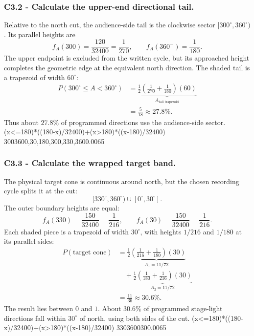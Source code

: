 	\subsubsection*{C3.2 - Calculate the upper-end directional tail.}
	\label{subsec:c3-triangular-north-b}
	Relative to the north cut, the audience-side tail is the clockwise sector
	$[300^\circ,360^\circ)$.  Its parallel heights are
	\[
	f_A(300)=\frac{120}{32400}=\frac1{270},
	\qquad f_A(360^-)=\frac1{180}.
	\]
	The upper endpoint is excluded from the written cycle, but its approached
	height completes the geometric edge at the equivalent north direction.  The
	shaded tail is a trapezoid of width $60^\circ$:
	\[
	\begin{aligned}
		P(300^\circ\le A<360^\circ)
		&=\underbrace{\frac12\left(\frac1{270}+\frac1{180}\right)(60)}
		_{A_{\text{tail trapezoid}}}\\
		&=\frac5{18}\approx27.8\%.
	\end{aligned}
	\]
	Thus about $27.8\%$ of programmed directions use the audience-side sector.
	\begingroup
	{(x<=180)*((180-x)/32400)+(x>180)*((x-180)/32400)}
	{300}{360}{0,30,180,300,330,360}{0.0065}
	\endgroup
	
	\clearpage
	\subsubsection*{C3.3 - Calculate the wrapped target band.}
	\label{subsec:c3-triangular-north-c}
	The physical target cone is continuous around north, but the chosen recording
	cycle splits it at the cut:
	\[
	[330^\circ,360^\circ)\cup[0^\circ,30^\circ].
	\]
	The outer boundary heights are equal:
	\[
	f_A(330)=\frac{150}{32400}=\frac1{216},
	\qquad f_A(30)=\frac{150}{32400}=\frac1{216}.
	\]
	Each shaded piece is a trapezoid of width $30^\circ$, with heights $1/216$
	and $1/180$ at its parallel sides:
	\[
	\begin{aligned}
		P(\text{target cone})
		&=\underbrace{\frac12\left(\frac1{216}+\frac1{180}\right)(30)}
		_{A_1=11/72}\\
		&\quad+\underbrace{\frac12\left(\frac1{180}+\frac1{216}\right)(30)}
		_{A_2=11/72}\\
		&=\frac{11}{36}\approx30.6\%.
	\end{aligned}
	\]
	The result lies between $0$ and $1$.  About $30.6\%$ of programmed stage-light
	directions fall within $30^\circ$ of north, using both sides of the cut.
	\begingroup
	{(x<=180)*((180-x)/32400)+(x>180)*((x-180)/32400)}
	{330}{360}{0}{30}{0.0065}
	\endgroup
	

